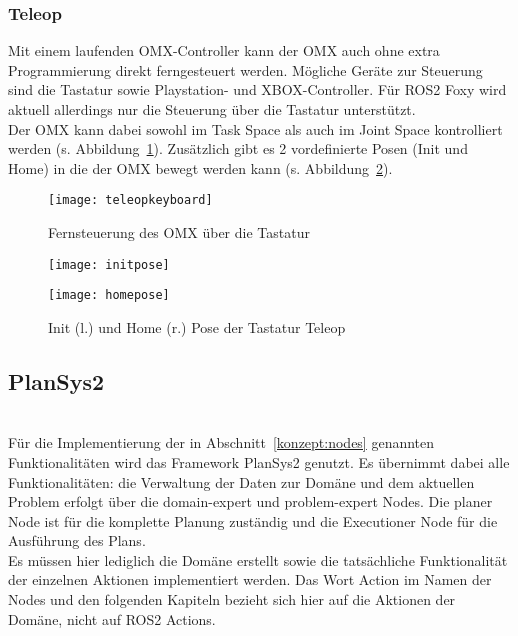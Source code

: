 \subsubsection{Teleop} \label{teleop}
Mit einem laufenden OMX-Controller kann der OMX auch ohne extra Programmierung direkt ferngesteuert werden.
Mögliche Geräte zur Steuerung sind die Tastatur sowie Playstation- und XBOX-Controller.
Für \ac{ROS2} Foxy wird aktuell allerdings nur die Steuerung über die Tastatur unterstützt.\\
Der OMX kann dabei sowohl im Task Space als auch im Joint Space kontrolliert werden (s. Abbildung~\ref{fig:teleopkeyboard}).
Zusätzlich gibt es 2 vordefinierte Posen (Init und Home) in die der OMX bewegt werden kann (s. Abbildung~\ref{fig:teleopposes}).
\begin{figure}[ht!]
\centering
\texttt{[image: teleopkeyboard]}
\caption{Fernsteuerung des OMX über die Tastatur}
\label{fig:teleopkeyboard}
\end{figure}
\begin{figure}[htb]
    \centering
    \begin{minipage}[t]{0.45\linewidth}
        \centering
        \texttt{[image: initpose]}
    \end{minipage}%
    \hfill
    \begin{minipage}[t]{0.45\linewidth}
        \centering
        \texttt{[image: homepose]}
    \end{minipage}
    \caption{Init (l.) und Home (r.) Pose der Tastatur Teleop}
    \label{fig:teleopposes}
\end{figure}



\subsection{PlanSys2}~\cite{plansys}\\
Für die Implementierung der in Abschnitt~\ref{konzept:nodes} genannten Funktionalitäten wird das Framework \ac{PlanSys2} genutzt.
Es übernimmt dabei alle Funktionalitäten: die Verwaltung der Daten zur Domäne und dem aktuellen Problem erfolgt über die domain-expert und problem-expert Nodes.
Die planer Node ist für die komplette Planung zuständig und die Executioner Node für die Ausführung des Plans.\\
Es müssen hier lediglich die Domäne erstellt sowie die tatsächliche Funktionalität der einzelnen Aktionen implementiert werden.
Das Wort Action im Namen der Nodes und den folgenden Kapiteln bezieht sich hier auf die Aktionen der Domäne, nicht auf \ac{ROS2} Actions.



